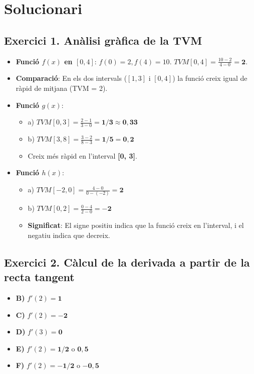 \documentclass[12pt,a4paper]{article}
\begin{document}
\newpage
\section*{Solucionari}

\subsection*{Exercici 1. Anàlisi gràfica de la TVM}
\begin{itemize}
    \item \textbf{Funció $f(x)$ en $[0, 4]$}: $f(0)=2, f(4)=10$. $TVM[0, 4] = \frac{10-2}{4-0} = \mathbf{2}$.
    \item \textbf{Comparació}: En els dos intervals ($[1,3]$ i $[0,4]$) la funció creix igual de ràpid de mitjana (TVM = 2).
    \item \textbf{Funció $g(x)$}:
    \begin{itemize}
        \item a) $TVM[0, 3] = \frac{2-1}{3-0} = \mathbf{1/3 \approx 0,33}$
        \item b) $TVM[3, 8] = \frac{3-2}{8-3} = \mathbf{1/5 = 0,2}$
        \item Creix més ràpid en l'interval \textbf{[0, 3]}.
    \end{itemize}
    \item \textbf{Funció $h(x)$}:
    \begin{itemize}
        \item a) $TVM[-2, 0] = \frac{4-0}{0-(-2)} = \mathbf{2}$
        \item b) $TVM[0, 2] = \frac{0-4}{2-0} = \mathbf{-2}$
        \item \textbf{Significat}: El signe positiu indica que la funció creix en l'interval, i el negatiu indica que decreix.
    \end{itemize}
\end{itemize}

\subsection*{Exercici 2. Càlcul de la derivada a partir de la recta tangent}
\begin{itemize}
    \item \textbf{B)} $f'(2) = \mathbf{1}$
    \item \textbf{C)} $f'(2) = \mathbf{-2}$
    \item \textbf{D)} $f'(3) = \mathbf{0}$
    \item \textbf{E)} $f'(2) = \mathbf{1/2}$ o $\mathbf{0,5}$
    \item \textbf{F)} $f'(2) = \mathbf{-1/2}$ o $\mathbf{-0,5}$
\end{itemize}
\end{document}
